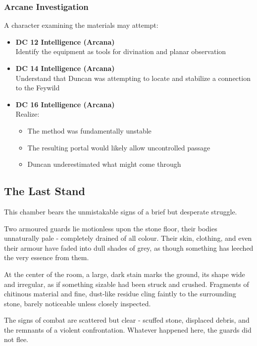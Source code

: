 \subsubsection*{Arcane Investigation}
{\entryfont A character examining the materials may attempt:
\begin{itemize}\renewcommand\labelitemi{\textbf{\textbullet}}
	\item \textbf{DC 12 Intelligence (Arcana)}\\Identify the equipment as tools for divination and planar observation
	\item \textbf{DC 14 Intelligence (Arcana)}\\Understand that Duncan was attempting to locate and stabilize a connection to the Feywild
	\item \textbf{DC 16 Intelligence (Arcana)}\\Realize:
	\begin{itemize}
		\item The method was fundamentally unstable
		\item The resulting portal would likely allow uncontrolled passage
		\item Duncan underestimated what might come through
	\end{itemize}
\end{itemize}}
\subsection*{ The Last Stand}
{\entryfont This chamber bears the unmistakable signs of a brief but desperate struggle.

Two armoured guards lie motionless upon the stone floor, their bodies unnaturally pale - completely drained of all colour. Their skin, clothing, and even their armour have faded into dull shades of grey, as though something has leeched the very essence from them.

At the center of the room, a large, dark stain marks the ground, its shape wide and irregular, as if something sizable had been struck and crushed. Fragments of chitinous material and fine, dust-like residue cling faintly to the surrounding stone, barely noticeable unless closely inspected.

The signs of combat are scattered but clear - scuffed stone, displaced debris, and the remnants of a violent confrontation. Whatever happened here, the guards did not flee.}
